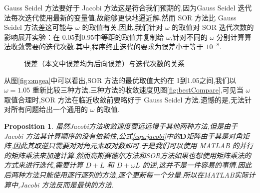\documentclass[a4paper]{article}
\numberwithin{equation}{section}
\newtheorem{proposition}{Proposition}
\newcommand{\bm}[1]{\boldsymbol{#1}}    %
\begin{document}
Gauss Seidel 方法要好于 Jacobi 方法这是符合我们预期的,因为Gauss Seidel 迭代法每次迭代使用最新的变量值,故能够更快地逼近解.然而 SOR 方法比 Gauss Seidel 方法差这可能与 $\omega$ 的取值有关,因此,我们针对 $\omega$ 的取值对 SOR 迭代次数的影响展开实验：在 0.05到0.95中等距的取值并复制给 $\omega$,针对不同的 $\omega$ 分别计算算法收敛需要的迭代次数.其中,程序终止迭代的要求为误差小于等于 $10^{-8}$.
\begin{figure}[htbp]
    \centering
    \quad %
    \caption{误差（本文中误差均为后向误差）与迭代次数的关系}
    \label{fig:sidebyside}
\end{figure}
从图\ref{fig:omgea}中可以看出,SOR 方法的最优取值大约在 1到1.05之间,我们以 $\omega=1.05$ 重新比较三种方法.三种方法的收敛速度见图\ref{fig:bestCompare},可见当 $\omega$ 取值合理时,SOR 方法在临近收敛前要略好于 Gauss Seidel 方法.遗憾的是,无法针对所有问题给出一个通用的 $\omega$ 的取值.

\begin{proposition}
    虽然Jacobi方法收敛速度要远远慢于其他两种方法,但是由于 Jacobi 方法其计算顺序的没有依赖性,公式\eqref{equ:jacobi}中的$\bm{D}$矩阵由于其是对角矩阵,因此其取逆只需要对对角元素取对数即可.于是我们可以使用 MATLAB 的并行的矩阵乘法来加速计算.然而高斯赛德尔方法和SOR方法如果也想使用矩阵乘法的方式来进行迭代,需要计算 $D+L$ 和 $D+\omega L$ 的逆,这并不是一件容易的事情.因此后两种方法只能使用逐行逐列的方法,逐个更新每一个分量.所以在MATLAB实际计算中,Jacobi 方法反而是最快的方法.
\end{proposition}
\end{document}
